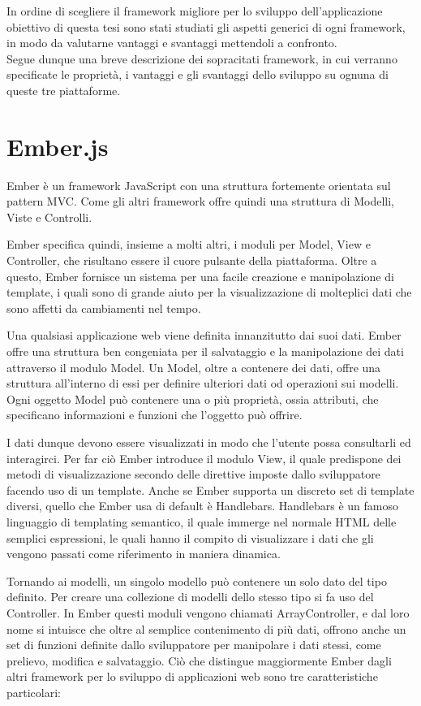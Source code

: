 In ordine di scegliere il framework migliore per lo sviluppo dell'applicazione obiettivo di questa tesi sono stati studiati gli aspetti generici di ogni framework, in modo da valutarne vantaggi e svantaggi mettendoli a confronto.\\

Segue dunque una breve descrizione dei sopracitati framework, in cui verranno specificate le proprietà, i vantaggi e gli svantaggi dello sviluppo su ognuna di queste tre piattaforme.

\newpage

\section{Ember.js} %
\label{sec:ember_js}

Ember è un framework JavaScript con una struttura fortemente orientata sul pattern MVC. Come gli altri framework offre quindi una struttura di Modelli, Viste e Controlli.

Ember specifica quindi, insieme a molti altri, i moduli per Model, View e Controller, che risultano essere il cuore pulsante della piattaforma.
Oltre a questo, Ember fornisce un sistema per una facile creazione e manipolazione di template, i quali sono di grande aiuto per la visualizzazione di molteplici dati che sono affetti da cambiamenti nel tempo.

Una qualsiasi applicazione web viene definita innanzitutto dai suoi dati. Ember offre una struttura ben congeniata per il salvataggio e la manipolazione dei dati attraverso il modulo Model. Un Model, oltre a contenere dei dati, offre una struttura all'interno di essi per definire ulteriori dati od operazioni sui modelli. Ogni oggetto Model può contenere una o più proprietà, ossia attributi, che specificano informazioni e funzioni che l'oggetto può offrire.

I dati dunque devono essere visualizzati in modo che l'utente possa consultarli ed interagirci. Per far ciò Ember introduce il modulo View, il quale predispone dei metodi di visualizzazione secondo delle direttive imposte dallo sviluppatore facendo uso di un template. Anche se Ember supporta un discreto set di template diversi, quello che Ember usa di default è Handlebars. Handlebars è un famoso linguaggio di templating semantico, il quale immerge nel normale HTML delle semplici espressioni, le quali hanno il compito di visualizzare i dati che gli vengono passati come riferimento in maniera dinamica.

Tornando ai modelli, un singolo modello può contenere un solo dato del tipo definito. Per creare una collezione di modelli dello stesso tipo si fa uso del Controller. In Ember questi moduli vengono chiamati ArrayController, e dal loro nome si intuisce che oltre al semplice contenimento di più dati, offrono anche un set di funzioni definite dallo sviluppatore per manipolare i dati stessi, come prelievo, modifica e salvataggio.
\newpage
Ciò che distingue maggiormente Ember dagli altri framework per lo sviluppo di applicazioni web sono tre caratteristiche particolari:

